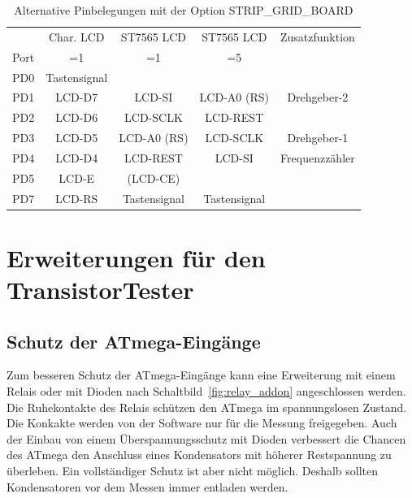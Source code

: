 \begin{table}[H]
  \begin{center}
    \begin{tabular}{| c || c | c | c | c |}
    \hline
           & Char. LCD      & ST7565 LCD     & ST7565 LCD   & Zusatzfunktion \\
      Port &    =1          &    =1          &    =5        &  \\
    \hline
    \hline
    PD0    &  Tastensignal  &                &              &  \\
    \hline
    PD1    &  LCD-D7        & LCD-SI         &  LCD-A0 (RS) &  Drehgeber-2 \\
    \hline
    PD2    &  LCD-D6        & LCD-SCLK       &  LCD-REST    &  \\
    \hline
    PD3    &  LCD-D5        & LCD-A0 (RS)    &  LCD-SCLK    &  Drehgeber-1 \\
    \hline
    PD4    &  LCD-D4        & LCD-REST       &  LCD-SI      &  Frequenzzähler \\
    \hline
    PD5    &  LCD-E         & (LCD-CE)       &              &  \\
    \hline
    PD7    & LCD-RS         & Tastensignal   & Tastensignal &  \\
    \hline
    \end{tabular}
  \end{center}
  \caption{Alternative Pinbelegungen mit der Option STRIP\_GRID\_BOARD}
\label{tab:grid-change}
\end{table}

\section{Erweiterungen für den TransistorTester}


\subsection{Schutz der ATmega-Eingänge}  

Zum besseren Schutz der ATmega-Eingänge kann eine Erweiterung mit einem Relais oder mit Dioden
nach Schaltbild~\ref{fig:relay_addon} angeschlossen werden.
Die Ruhekontakte des Relais schützen den ATmega im spannungslosen Zustand.
Die Konkakte werden von der Software nur für die Messung freigegeben.
Auch der Einbau von einem Überspannungsschutz mit Dioden verbessert die Chancen des ATmega
den Anschluss eines Kondensators mit höherer Restspannung zu überleben.
Ein vollständiger Schutz ist aber nicht möglich. Deshalb sollten Kondensatoren vor dem Messen immer
entladen werden.


